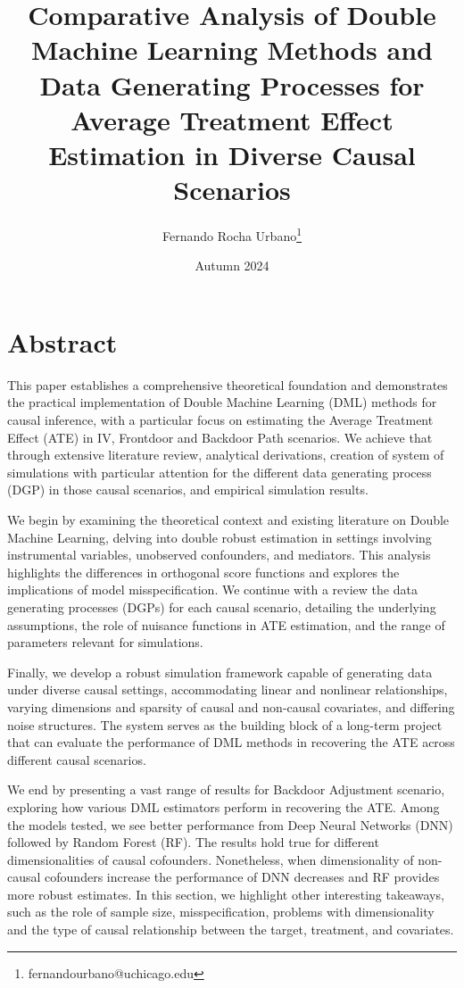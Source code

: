\documentclass{article}
\title{Comparative Analysis of Double Machine Learning Methods and Data Generating Processes for Average Treatment Effect Estimation in Diverse Causal Scenarios}
\author{Fernando Rocha Urbano\footnote{fernandourbano@uchicago.edu}}
\date{Autumn 2024}
\numberwithin{equation}{section}
\begin{document}
\maketitle

\section{Abstract}

This paper establishes a comprehensive theoretical foundation and demonstrates the practical implementation of Double Machine Learning (DML) methods for causal inference, with a particular focus on estimating the Average Treatment Effect (ATE) in IV, Frontdoor and Backdoor Path scenarios. We achieve that through extensive literature review, analytical derivations, creation of system of simulations with particular attention for the different data generating process (DGP) in those causal scenarios, and empirical simulation results.

We begin by examining the theoretical context and existing literature on Double Machine Learning, delving into double robust estimation in settings involving instrumental variables, unobserved confounders, and mediators. This analysis highlights the differences in orthogonal score functions and explores the implications of model misspecification. We continue with a review the data generating processes (DGPs) for each causal scenario, detailing the underlying assumptions, the role of nuisance functions in ATE estimation, and the range of parameters relevant for simulations.

Finally, we develop a robust simulation framework capable of generating data under diverse causal settings, accommodating linear and nonlinear relationships, varying dimensions and sparsity of causal and non-causal covariates, and differing noise structures. The system serves as the building block of a long-term project that can evaluate the performance of DML methods in recovering the ATE across different causal scenarios.

We end by presenting a vast range of results for Backdoor Adjustment scenario, exploring how various DML estimators perform in recovering the ATE. Among the models tested, we see better performance from Deep Neural Networks (DNN) followed by Random Forest (RF). The results hold true for different dimensionalities of causal cofounders. Nonetheless, when dimensionality of non-causal cofounders increase the performance of DNN decreases and RF provides more robust estimates. In this section, we highlight other interesting takeaways, such as the role of sample size, misspecification, problems with dimensionality and the type of causal relationship between the target, treatment, and covariates.
\end{document}
